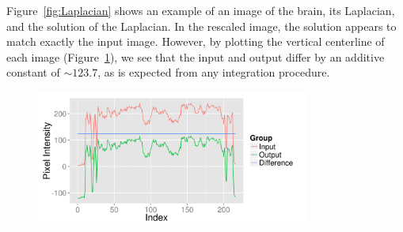Figure~\ref{fig:Laplacian} shows an example of an image of the brain, its Laplacian, and the solution of the Laplacian.  In the rescaled image, the solution appears to match exactly the input image.  However, by plotting the vertical centerline of each image (Figure~\ref{fig:Additive}), we see that the input and output differ by an additive constant of $\sim123.7$, as is expected from any integration procedure.

\begin{figure}
\center
\includegraphics[width=0.8\textwidth]{images/appendix/additive_constant.png}
\label{fig:Additive}
\end{figure}
